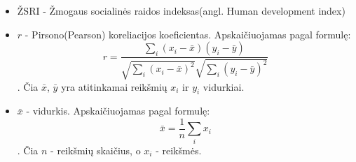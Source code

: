 \begin{itemize}
    \item ŽSRI - Žmogaus socialinės raidos indeksas(angl. Human development index)
    \item $r$ - Pirsono(Pearson) koreliacijos koeficientas. Apskaičiuojamas pagal formulę:
    \[r = \frac{\sum\limits_i (x_i - \bar{x})(y_i - \bar{y})}{\sqrt{\sum\limits_i(x_i - \bar{x})^2}\sqrt{\sum\limits_i(y_i - \bar{y})^2}}\]. Čia $\bar{x}$, $\bar{y}$ yra atitinkamai reikšmių $x_i$ ir $y_i$ vidurkiai.
    \item $\bar{x}$ - vidurkis. Apskaičiuojamas pagal formulę:
    \[\bar{x} = \frac{1}{n} \sum\limits_{i} x_i\]. Čia $n$ - reikšmių skaičius, o $x_i$ - reikšmės.
\end{itemize}
